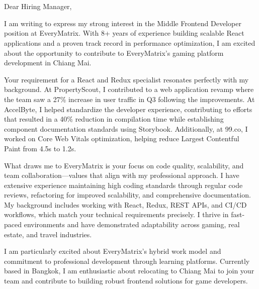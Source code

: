\documentclass[11pt,a4paper,sans]{moderncv}
\begin{document}
\makecvtitle

\vspace{-30pt}

\section{}

Dear Hiring Manager,

\vspace{10pt}

I am writing to express my strong interest in the Middle Frontend Developer position at EveryMatrix. With 8+ years of experience building scalable React applications and a proven track record in performance optimization, I am excited about the opportunity to contribute to EveryMatrix's gaming platform development in Chiang Mai.

\vspace{8pt}

Your requirement for a React and Redux specialist resonates perfectly with my background. At PropertyScout, I contributed to a web application revamp where the team saw a 27\% increase in user traffic in Q3 following the improvements. At AccelByte, I helped standardize the developer experience, contributing to efforts that resulted in a 40\% reduction in compilation time while establishing component documentation standards using Storybook. Additionally, at 99.co, I worked on Core Web Vitals optimization, helping reduce Largest Contentful Paint from 4.5s to 1.2s.

\vspace{8pt}

What draws me to EveryMatrix is your focus on code quality, scalability, and team collaboration---values that align with my professional approach. I have extensive experience maintaining high coding standards through regular code reviews, refactoring for improved scalability, and comprehensive documentation. My background includes working with React, Redux, REST APIs, and CI/CD workflows, which match your technical requirements precisely. I thrive in fast-paced environments and have demonstrated adaptability across gaming, real estate, and travel industries.

\vspace{8pt}

I am particularly excited about EveryMatrix's hybrid work model and commitment to professional development through learning platforms. Currently based in Bangkok, I am enthusiastic about relocating to Chiang Mai to join your team and contribute to building robust frontend solutions for game developers.
\end{document}

